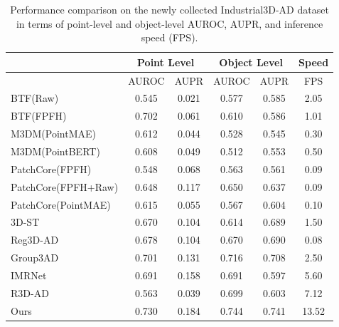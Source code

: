 \begin{table}[ht]
\centering
\caption{Performance comparison on the newly collected Industrial3D-AD dataset in terms of point-level and object-level AUROC, AUPR, and inference speed (FPS).}
\label{tab:Industrial3D}
\begin{tabular}{l|cc|cc|c}
\hline
& \multicolumn{2}{c|}{Point Level} & \multicolumn{2}{c|}{Object Level} & Speed \\
\hline
& AUROC & AUPR & AUROC & AUPR & FPS \\
\hline
BTF(Raw)                            & 0.545 & 0.021 & 0.577 & 0.585  & 2.05 \\
BTF(FPFH)                           & 0.702 & 0.061 & 0.610 & 0.586  & 1.01 \\
M3DM(PointMAE)                      & 0.612 & 0.044 & 0.528 & 0.545  & 0.30 \\
M3DM(PointBERT)                     & 0.608 & 0.049 & 0.512 & 0.553  & 0.50 \\
PatchCore(FPFH)                     & 0.548 & 0.068 & 0.563 & 0.561  & 0.09 \\
PatchCore(FPFH+Raw)                 & 0.648 & 0.117 & 0.650 & 0.637  & 0.09 \\
PatchCore(PointMAE)                 & 0.615 & 0.055 & 0.567 & 0.604  & 0.10 \\
3D-ST \cite{bergmann2023anomaly}  & 0.670 & 0.104 & 0.614 & 0.689  & 1.50 \\
Reg3D-AD \cite{liu2023real3d}     & 0.678 & 0.104 & 0.670 & 0.690  & 0.08 \\
Group3AD \cite{zhu2024towards}    & 0.701 & 0.131 & 0.716 & 0.708  & 2.50 \\
IMRNet \cite{li2024towards}       & 0.691 & 0.158 & 0.691 & 0.597  & 5.60 \\
R3D-AD \cite{zhou2024r3d}         & 0.563 & 0.039 & 0.699 & 0.603  & 7.12 \\
Ours                                & 0.730 & 0.184 & 0.744 & 0.741 & 13.52 \\
\hline
\end{tabular}
\end{table}

